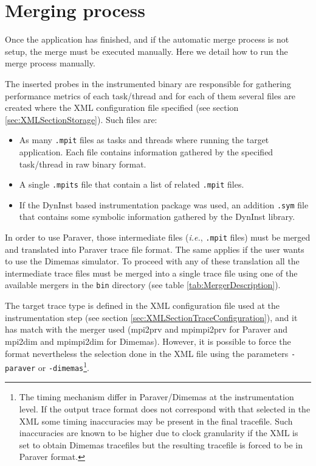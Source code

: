 
\chapter{Merging process}\label{cha:Merging}

Once the application has finished, and if the automatic merge process is not setup, the merge must be executed manually. Here we detail how to run the merge process manually.

The inserted probes in the instrumented binary are responsible for gathering performance metrics of each task/thread and for each of them several files are created where the XML configuration file specified (see section \ref{sec:XMLSectionStorage}). Such files are:

\begin{itemize}
 \item As many {\tt .mpit} files as tasks and threads where running the target application. Each file contains information gathered by the specified task/thread in raw binary format.
 \item A single {\tt .mpits} file that contain a list of related {\tt .mpit} files.
 \item If the DynInst based instrumentation package was used, an addition {\tt .sym} file that contains some symbolic information gathered by the DynInst library.
\end{itemize}

In order to use Paraver, those intermediate files ({\it i.e.}, {\tt .mpit} files) must be merged and translated into Paraver trace file format. The same applies if the user wants to use the Dimemas simulator. To proceed with any of these translation all the intermediate trace files must be merged into a single trace file using one of the available mergers in the {\tt bin} directory (see table \ref{tab:MergerDescription}).

The target trace type is defined in the XML configuration file used at the instrumentation step (see section \ref{sec:XMLSectionTraceConfiguration}), and it has match with the merger used (mpi2prv and mpimpi2prv for Paraver and mpi2dim and mpimpi2dim for Dimemas). However, it is possible to force the format nevertheless the selection done in the XML file using the parameters {\tt -paraver} or {\tt -dimemas}\footnote{The timing mechanism differ in Paraver/Dimemas at the instrumentation level. If the output trace format does not correspond with that selected in the XML some timing inaccuracies may be present in the final tracefile. Such inaccuracies are known to be higher due to clock granularity if the XML is set to obtain Dimemas tracefiles but the resulting tracefile is forced to be in Paraver format.}.

